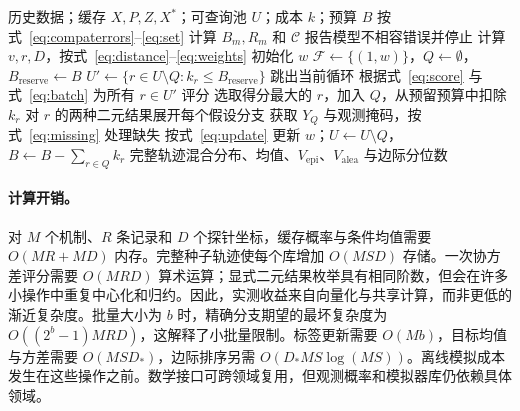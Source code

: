 \begin{algorithm}[tbp]
\caption{基于缓存过程证据的相容机制推断}
\label{alg:main}
\small
\begin{algorithmic}[1]
\Require 历史数据；缓存 $X,P,Z,X^*$；可查询池 $U$；成本 $k$；预算 $B$
\State 按式~\eqref{eq:compaterrors}--\eqref{eq:set} 计算 $B_m,R_m$ 和 $\mathcal C$
 \State 报告模型不相容错误并停止
\EndIf
\State 计算 $v,r,D$，按式~\eqref{eq:distance}--\eqref{eq:weights} 初始化 $w$
 \State $\mathcal F\gets\{(1,w)\}$，$Q\gets\emptyset$，$B_{\mathrm{reserve}}\gets B$
  \State $U'\gets\{r\in U\setminus Q:k_r\leq B_{\mathrm{reserve}}\}$
   \State 跳出当前循环 \EndIf
  \State 根据式~\eqref{eq:score} 与式~\eqref{eq:batch} 为所有 $r\in U'$ 评分
  \State 选取得分最大的 $r$，加入 $Q$，从预留预算中扣除 $k_r$
  \State 对 $r$ 的两种二元结果展开每个假设分支
 \EndFor
 \State 获取 $Y_Q$ 与观测掩码，按式~\eqref{eq:missing} 处理缺失
 \State 按式~\eqref{eq:update} 更新 $w$；$U\gets U\setminus Q$，$B\gets B-\sum_{r\in Q}k_r$
\EndWhile
\State \Return 完整轨迹混合分布、均值、$V_{\mathrm{epi}}$、$V_{\mathrm{alea}}$ 与边际分位数
\end{algorithmic}
\end{algorithm}

\paragraph{计算开销。}
对 $M$ 个机制、$R$ 条记录和 $D$ 个探针坐标，缓存概率与条件均值需要 $O(MR+MD)$ 内存。完整种子轨迹使每个库增加 $O(MSD)$ 存储。一次协方差评分需要 $O(MRD)$ 算术运算；显式二元结果枚举具有相同阶数，但会在许多小操作中重复中心化和归约。因此，实测收益来自向量化与共享计算，而非更低的渐近复杂度。批量大小为 $b$ 时，精确分支期望的最坏复杂度为 $O((2^b-1)MRD)$，这解释了小批量限制。标签更新需要 $O(Mb)$，目标均值与方差需要 $O(MSD_*)$，边际排序另需 $O(D_*MS\log(MS))$。离线模拟成本发生在这些操作之前。数学接口可跨领域复用，但观测概率和模拟器库仍依赖具体领域。

